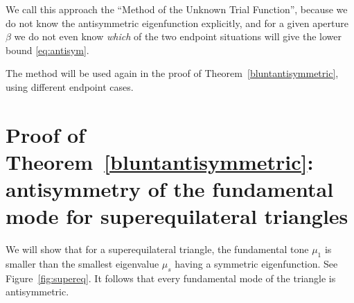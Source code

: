 \documentclass[11pt,reqno]{amsart}
\numberwithin{equation}{section}
\begin{document}
We call this approach the ``Method of the Unknown Trial
Function'', because we do not know the antisymmetric eigenfunction
explicitly, and for a given aperture $\beta$ we do not even know
\textit{which} of the two endpoint situations will give the
lower bound \eqref{eq:antisym}.

The method will be used again in the proof of
Theorem~\ref{bluntantisymmetric}, using different endpoint cases.

\section{\bf Proof of Theorem~\ref{bluntantisymmetric}: antisymmetry of the fundamental mode for superequilateral triangles} \label{isec4}

We will show that for a superequilateral triangle, the fundamental tone $\mu_1$ is smaller than the smallest eigenvalue $\mu_s$ having a symmetric eigenfunction. See Figure~\ref{fig:supereq}. It follows that every fundamental mode of the triangle is antisymmetric.
\end{document}
